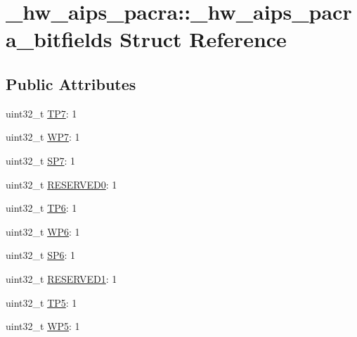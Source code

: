 \hypertarget{struct__hw__aips__pacra_1_1__hw__aips__pacra__bitfields}{}\section{\+\_\+hw\+\_\+aips\+\_\+pacra\+:\+:\+\_\+hw\+\_\+aips\+\_\+pacra\+\_\+bitfields Struct Reference}
\label{struct__hw__aips__pacra_1_1__hw__aips__pacra__bitfields}
\subsection*{Public Attributes}
\begin{DoxyCompactItemize}
\item 
uint32\+\_\+t \hyperlink{struct__hw__aips__pacra_1_1__hw__aips__pacra__bitfields_a88c597b6d03be9200469c83aa41e51cd}{T\+P7}\+: 1
\item 
uint32\+\_\+t \hyperlink{struct__hw__aips__pacra_1_1__hw__aips__pacra__bitfields_a1148ff58fd781f41590b0b40c1bbbb7c}{W\+P7}\+: 1
\item 
uint32\+\_\+t \hyperlink{struct__hw__aips__pacra_1_1__hw__aips__pacra__bitfields_af1a140309fca492ba57300fee961351c}{S\+P7}\+: 1
\item 
uint32\+\_\+t \hyperlink{struct__hw__aips__pacra_1_1__hw__aips__pacra__bitfields_a815228723079bee2e9951bad792297de}{R\+E\+S\+E\+R\+V\+E\+D0}\+: 1
\item 
uint32\+\_\+t \hyperlink{struct__hw__aips__pacra_1_1__hw__aips__pacra__bitfields_aabdb8cef5f281808e77d420b29018a93}{T\+P6}\+: 1
\item 
uint32\+\_\+t \hyperlink{struct__hw__aips__pacra_1_1__hw__aips__pacra__bitfields_a9b63f6c79668dbee286c42abfc533cdd}{W\+P6}\+: 1
\item 
uint32\+\_\+t \hyperlink{struct__hw__aips__pacra_1_1__hw__aips__pacra__bitfields_ad210a20a75630a2c0027bbffeb6f30a5}{S\+P6}\+: 1
\item 
uint32\+\_\+t \hyperlink{struct__hw__aips__pacra_1_1__hw__aips__pacra__bitfields_a183a2a2dfd54e9c769d29904361d0d92}{R\+E\+S\+E\+R\+V\+E\+D1}\+: 1
\item 
uint32\+\_\+t \hyperlink{struct__hw__aips__pacra_1_1__hw__aips__pacra__bitfields_ae81f515b0baff1445a6716612ac52b60}{T\+P5}\+: 1
\item 
uint32\+\_\+t \hyperlink{struct__hw__aips__pacra_1_1__hw__aips__pacra__bitfields_a02d67b9c32e6afdc821f60d7fdbc11d0}{W\+P5}\+: 1

\end{DoxyCompactItemize}
